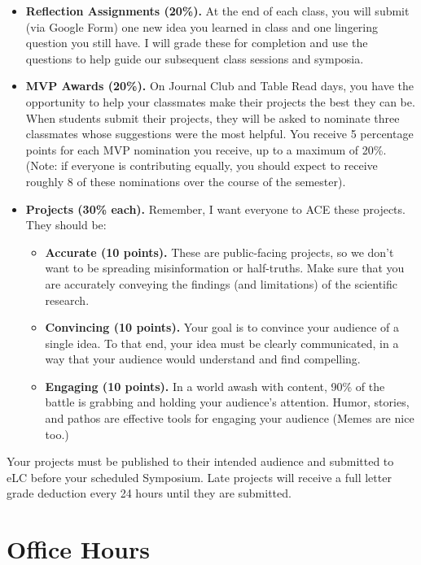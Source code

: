 \documentclass[11pt, letterpaper]{article}
\begin{document}
\begin{itemize}
	\item \textbf{Reflection Assignments (20\%).} At the end of each class, you will submit (via Google Form) one new idea you learned in class and one lingering question you still have. I will grade these for completion and use the questions to help guide our subsequent class sessions and symposia.
	\item \textbf{MVP Awards (20\%).} On Journal Club and Table Read days, you have the opportunity to help your classmates make their projects the best they can be. When students submit their projects, they will be asked to nominate three classmates whose suggestions were the most helpful. You receive 5 percentage points for each MVP nomination you receive, up to a maximum of 20\%. (Note: if everyone is contributing equally, you should expect to receive roughly 8 of these nominations over the course of the semester).
	\item \textbf{Projects (30\% each).} Remember, I want everyone to ACE these projects. They should be:
		\begin{itemize}
			\item \textbf{Accurate (10 points).} These are public-facing projects, so we don't want to be spreading misinformation or half-truths. Make sure that you are accurately conveying the findings (and limitations) of the scientific research.
			\item \textbf{Convincing (10 points).} Your goal is to convince your audience of a single idea. To that end, your idea must be clearly communicated, in a way that your audience would understand and find compelling.
			\item \textbf{Engaging (10 points).} In a world awash with content, 90\% of the battle is grabbing and holding your audience's attention. Humor, stories, and pathos are effective tools for engaging your audience (Memes are nice too.)
		\end{itemize}
\end{itemize}

\noindent Your projects must be published to their intended audience and submitted to eLC before your scheduled Symposium. Late projects will receive a full letter grade deduction every 24 hours until they are submitted.

\section*{Office Hours}
\end{document}
